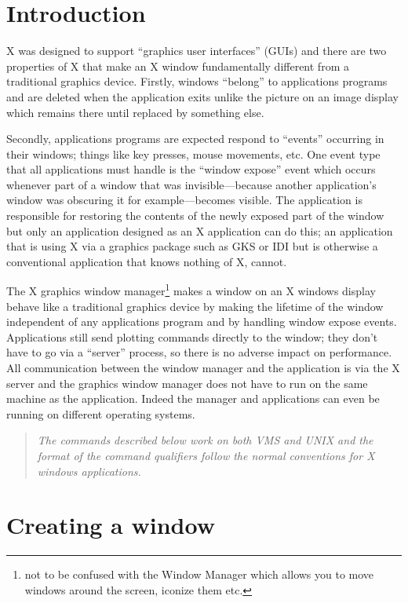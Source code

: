 \section{Introduction}

X was designed to support ``graphics user interfaces'' (GUIs) and there are two
properties of X that make an X window fundamentally different from a
traditional graphics device.
Firstly, windows ``belong'' to applications programs and are deleted when the
application exits unlike the picture on an image display which remains there
until replaced by something else. 

Secondly, applications
programs are expected respond to ``events'' occurring in their windows;
things like key presses, mouse movements, etc. One event type that all
applications must handle is the ``window expose'' event which occurs whenever
part of a window that was invisible---because another application's window was
obscuring it for example---becomes visible. The application is responsible for
restoring the contents of the newly exposed part of the window but only an
application designed as an X application can do this; an application that is
using X via a graphics package such as GKS or IDI but is otherwise a
conventional application that knows nothing of X, cannot.

The X graphics window manager\footnote{not to be confused with the Window
Manager which allows you to move windows around the screen, iconize them etc.}
makes a window on an X windows display behave like a
traditional graphics device by making the lifetime of the window independent
of any applications program and by handling window expose events. Applications
still send plotting commands directly to the window; they don't have to go via
a ``server'' process, so there is no adverse impact on performance. All
communication between the window manager and the application is via the X
server and the graphics window manager does not have to run on the same 
machine as the application.
Indeed the manager and applications can even be running on different operating
systems. 

\begin{quote}\em
The commands described below work on both VMS and UNIX and the format of the
command qualifiers follow the normal conventions for X windows applications.
\end{quote}
\section{Creating a window} 

